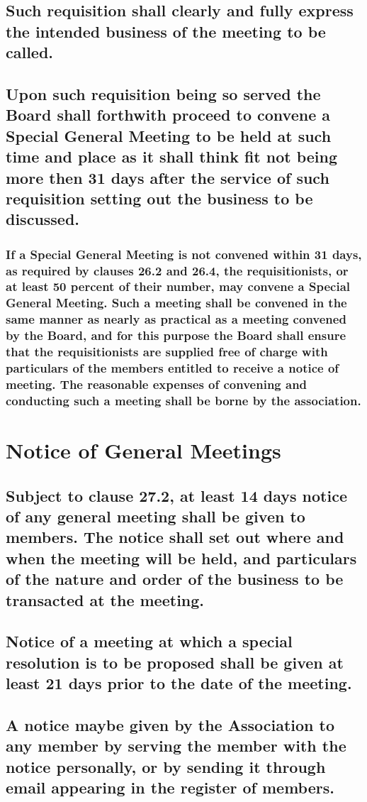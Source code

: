 \documentclass{article}
\newenvironment{subs}
  {\adjustwidth{2em}{0pt}}
  {\endadjustwidth}
\begin{document}
\begin{subs}
\begin{subs}
\begin{subs}
\subsection{Such requisition shall clearly and fully express the intended business of the meeting to be called.}
\subsection{Upon such requisition being so served the Board shall forthwith proceed to convene a Special General Meeting to be held at such time and place as it shall think fit not being more then 31 days after the service of such requisition setting out the business to be discussed.}
\subsubsection{If a Special General Meeting is not convened within 31 days, as required by clauses 26.2 and 26.4, the requisitionists, or at least 50 percent of their number, may convene a Special General Meeting. Such a meeting shall be convened in the same manner as nearly as practical as a meeting convened by the Board, and for this purpose the Board shall ensure that the requisitionists are supplied free of charge with particulars of the members entitled to receive a notice of meeting. The reasonable expenses of convening and conducting such a meeting shall be borne by the association.}
\end{subs}

\section{Notice of General Meetings}
\begin{subs}
\subsection{Subject to clause 27.2, at least 14 days notice of any general meeting shall be given to members. The notice shall set out where and when the meeting will be held, and particulars of the nature and order of the business to be transacted at the meeting.}
\subsection{Notice of a meeting at which a special resolution is to be proposed shall be given at least 21 days prior to the date of the meeting.}
\subsection{A notice maybe given by the Association to any member by serving the member with the notice personally, or by sending it through email appearing in the register of members.}


\end{subs}
\end{subs}
\end{subs}
\end{document}
